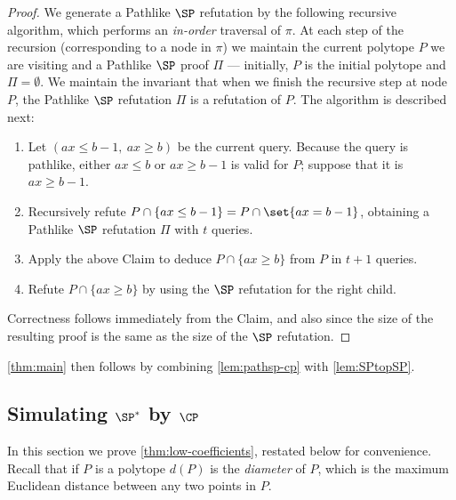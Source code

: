 \begin{proof}
	We generate a Pathlike $\SP$ refutation by the following recursive algorithm, which performs an \emph{in-order} traversal of $\pi$. 
	At each step of the recursion (corresponding to a node in $\pi$) we maintain the current polytope $P$ we are visiting and a Pathlike $\SP$ proof $\Pi$ --- initially, $P$ is the initial polytope and $\Pi = \emptyset$. 
	We maintain the invariant that when we finish the recursive step at node $P$, the Pathlike $\SP$ refutation $\Pi$ is a refutation of $P$. 
	The algorithm is described next:
	\begin{enumerate}
		\item Let $(ax \leq b-1,~ ax \geq b)$ be the current query. Because the query is pathlike, either $ax \leq b$ or $ax \geq b-1$ is valid for $P$; suppose that it is $ax \geq b-1$. 
		\item Recursively refute $P \cap \{ ax \leq b-1\} = P \cap \set{ax = b-1}$, obtaining a Pathlike $\SP$ refutation $\Pi$ with $t$ queries. 
		\item Apply the above Claim to deduce $P \cap \{ax \geq b\}$ from $P$ in $t+1$ queries. 
		\item Refute $P \cap \{ ax \geq b\}$ by using the $\SP$ refutation for the right child. 
	\end{enumerate}
	Correctness follows immediately from the Claim, and also since the size of the resulting proof is the same as the size of the $\SP$ refutation. 		
	\end{proof}
	
	\autoref{thm:main} then follows by combining \autoref{lem:pathsp-cp} with \autoref{lem:SPtopSP}.


\subsection{Simulating \texorpdfstring{$\SP^*$}{SP*} by
          \texorpdfstring{$\CP$}{CP}}
\label{sec:quasipoly-simulation}
In this section we prove \autoref{thm:low-coefficients}, restated below for convenience.
Recall that if $P$ is a polytope $d(P)$ is the \emph{diameter} of $P$, which is the maximum Euclidean distance between any two points in $P$.

\lowcoefficients*


